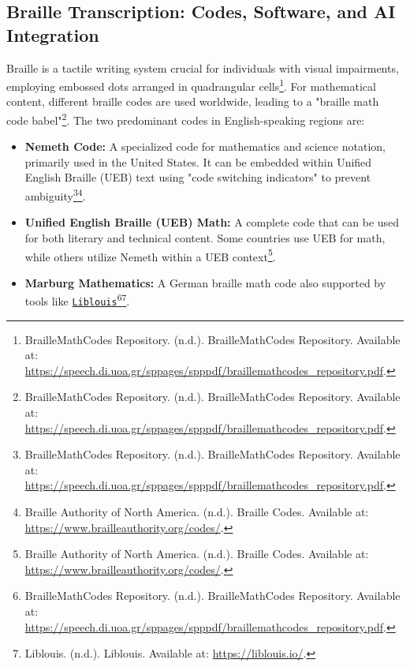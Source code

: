 \subsection{Braille Transcription: Codes, Software, and AI Integration}
Braille is a tactile writing system crucial for individuals with visual impairments, employing embossed dots arranged in quadrangular cells\footnote{BrailleMathCodes Repository. (n.d.). BrailleMathCodes Repository. Available at: \url{https://speech.di.uoa.gr/sppages/spppdf/braillemathcodes_repository.pdf}.}. For mathematical content, different braille codes are used worldwide, leading to a "braille math code babel"\footnote{BrailleMathCodes Repository. (n.d.). BrailleMathCodes Repository. Available at: \url{https://speech.di.uoa.gr/sppages/spppdf/braillemathcodes_repository.pdf}.}. The two predominant codes in English-speaking regions are:
\begin{itemize}
    \item \textbf{Nemeth Code:} A specialized code for mathematics and science notation, primarily used in the United States. It can be embedded within Unified English Braille (UEB) text using "code switching indicators" to prevent ambiguity\footnote{BrailleMathCodes Repository. (n.d.). BrailleMathCodes Repository. Available at: \url{https://speech.di.uoa.gr/sppages/spppdf/braillemathcodes_repository.pdf}.}\footnote{Braille Authority of North America. (n.d.). Braille Codes. Available at: \url{https://www.brailleauthority.org/codes/}.}.
    \item \textbf{Unified English Braille (UEB) Math:} A complete code that can be used for both literary and technical content. Some countries use UEB for math, while others utilize Nemeth within a UEB context\footnote{Braille Authority of North America. (n.d.). Braille Codes. Available at: \url{https://www.brailleauthority.org/codes/}.}.
    \item \textbf{Marburg Mathematics:} A German braille math code also supported by tools like \href{https://liblouis.io/}{\texttt{Liblouis}}\footnote{BrailleMathCodes Repository. (n.d.). BrailleMathCodes Repository. Available at: \url{https://speech.di.uoa.gr/sppages/spppdf/braillemathcodes_repository.pdf}.}\footnote{Liblouis. (n.d.). Liblouis. Available at: \url{https://liblouis.io/}.}.
\end{itemize}

